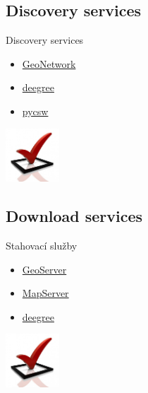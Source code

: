 \documentclass[xcolor=dvipsnames]{beamer}
\begin{document}
\subsection{Discovery services}
\begin{frame}{Discovery services}
    \begin{itemize}
        \item \href{http://geonetwork-opensource.org}{GeoNetwork}
        \item \href{http://deegree.org}{deegree}
        \item \href{http://pycsw.org}{pycsw}
    \end{itemize}
    \begin{flushright} \includegraphics[width=2cm]{imgs/ils/done.jpg} \end{flushright}
\end{frame}

\subsection{Download services}
\begin{frame}{Stahovací služby}
    \begin{itemize}
        \item \href{http://geoserver.org}{GeoServer}
        \item \href{http://mapserver.org}{MapServer}
        \item \href{http://deegree.org}{deegree}
    \end{itemize}
    \begin{flushright}\includegraphics[width=2cm]{imgs/ils/done.jpg}\end{flushright}
\end{frame}
\end{document}
